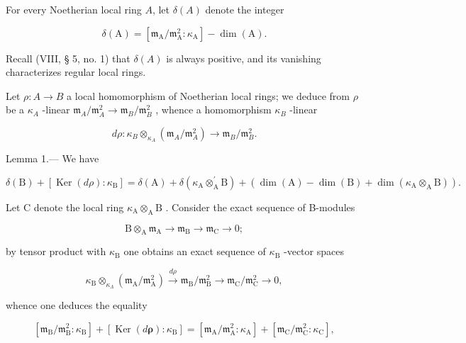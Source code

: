 For every Noetherian local ring \( A \), let \( \delta(A) \) denote the integer

\[
\delta (\mathrm{A}) = \left[ \mathfrak {m} _ {\mathrm{A}} / \mathfrak {m} _ {\mathrm{A}} ^ {2}: \kappa_ {\mathrm{A}} \right] - \dim (\mathrm{A}).
\]

Recall (VIII, § 5, no. 1) that \(\delta(A)\) is always positive, and its vanishing characterizes regular local rings.

Let \(\rho : A \to B\) a local homomorphism of Noetherian local rings; we deduce from \(\rho\) be a \(\kappa_{A}\) -linear \(\mathfrak{m}_{A}/\mathfrak{m}_{A}^{2} \longrightarrow \mathfrak{m}_{B}/\mathfrak{m}_{B}^{2}\) , whence a homomorphism \(\kappa_{B}\) -linear

\[
d \rho : \kappa_ {B} \otimes_ {\kappa_ {A}} \left(\mathfrak {m} _ {A} / \mathfrak {m} _ {A} ^ {2}\right) \longrightarrow \mathfrak {m} _ {B} / \mathfrak {m} _ {B} ^ {2}.
\]

Lemma 1.--- We have

\[
\delta (\mathrm{B}) + \left[ \operatorname{Ker} (d \rho): \kappa_ {\mathrm{B}} \right] = \delta (\mathrm{A}) + \delta \left(\kappa_ {\mathrm{A}} \otimes_ {\mathrm{A}} ^ {\prime} \mathrm{B}\right) + (\dim (\mathrm{A}) - \dim (\mathrm{B}) + \dim \left(\kappa_ {\mathrm{A}} \otimes_ {\mathrm{A}} \mathrm{B}\right)).
\]

Let C denote the local ring \(\kappa_{\mathrm{A}}\otimes_{\mathrm{A}}\mathrm{B}\) . Consider the exact sequence of B-modules

\[
\mathrm{B} \otimes_ {\mathrm{A}} \mathfrak {m} _ {\mathrm{A}} \longrightarrow \mathfrak {m} _ {\mathrm{B}} \longrightarrow \mathfrak {m} _ {\mathrm{C}} \rightarrow 0;
\]

by tensor product with \(\kappa_{\mathrm{B}}\) one obtains an exact sequence of \(\kappa_{\mathrm{B}}\) -vector spaces

\[
\kappa_ {\mathrm{B}} \otimes_ {\kappa_ {\Lambda}} (\mathfrak {m} _ {\mathrm{A}} / \mathfrak {m} _ {\mathrm{A}} ^ {2}) \stackrel {d \rho} {\longrightarrow} \mathfrak {m} _ {\mathrm{B}} / \mathfrak {m} _ {\mathrm{B}} ^ {2} \longrightarrow \mathfrak {m} _ {\mathrm{C}} / \mathfrak {m} _ {\mathrm{C}} ^ {2} \rightarrow 0,
\]

whence one deduces the equality

\[
\left[ \mathfrak {m} _ {\mathrm{B}} / \mathfrak {m} _ {\mathrm{B}} ^ {2}: \kappa_ {\mathrm{B}} \right] + \left[ \operatorname{Ker} (d \boldsymbol {\rho}): \kappa_ {\mathrm{B}} \right] = \left[ \mathfrak {m} _ {\mathrm{A}} / \mathfrak {m} _ {\mathrm{A}} ^ {2}: \kappa_ {\mathrm{A}} \right] + \left[ \mathfrak {m} _ {\mathrm{C}} / \mathfrak {m} _ {\mathrm{C}} ^ {2}: \kappa_ {\mathrm{C}} \right],
\]

